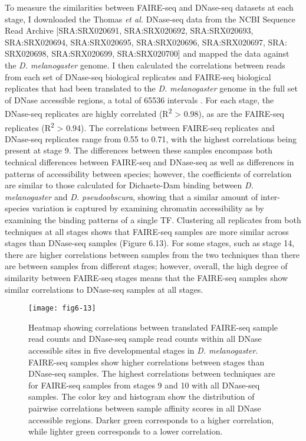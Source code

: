 To measure the similarities between FAIRE-seq and DNase-seq datasets at each stage, I downloaded the Thomas \emph{et al.} DNase-seq data from the NCBI Sequence Read Archive [SRA:SRX020691, SRA:SRX020692, SRA:SRX020693, SRA:SRX020694, SRA:SRX020695, SRA:SRX020696, SRA:SRX020697, SRA:\\
SRX020698, SRA:SRX020699, SRA:SRX020700] and mapped the data against the \emph{D. melanogaster} genome. I then calculated the correlations between reads from each set of DNase-seq biological replicates and FAIRE-seq biological replicates that had been translated to the \emph{D. melanogaster} genome in the full set of DNase accessible regions, a total of 65536 intervals \citep{thomas_dynamic_2011}. For each stage, the DNase-seq replicates are highly correlated (R\textsuperscript{2} > 0.98), as are the FAIRE-seq replicates (R\textsuperscript{2} > 0.94). The correlations between FAIRE-seq replicates and DNase-seq replicates range from 0.55 to 0.71, with the highest correlations being present at stage 9. The differences between these samples encompass both technical differences between FAIRE-seq and DNase-seq as well as differences in patterns of accessibility between species; however, the coefficients of correlation are similar to those calculated for Dichaete-Dam binding between \emph{D. melanogaster} and \emph{D. pseudoobscura}, showing that a similar amount of inter-species variation is captured by examining chromatin accessibility as by examining the binding patterns of a single TF. Clustering all replicates from both techniques at all stages shows that FAIRE-seq samples are more similar across stages than DNase-seq samples (Figure 6.13). For some stages, such as stage 14, there are higher correlations between samples from the two techniques than there are between samples from different stages; however, overall, the high degree of similarity between FAIRE-seq stages means that the FAIRE-seq samples show similar correlations to DNase-seq samples at all stages.\\

\begin{figure}
\centering
\texttt{[image: fig6-13]}
\caption{Heatmap showing correlations between translated FAIRE-seq sample read counts and DNase-seq sample read counts within all DNase accessible sites in five developmental stages in \emph{D. melanogaster}. FAIRE-seq samples show higher correlations between stages than DNase-seq samples. The highest correlations between techniques are for FAIRE-seq samples from stages 9 and 10 with all DNase-seq samples. The color key and histogram show the distribution of pairwise correlations between sample affinity scores in all DNase accessible regions. Darker green corresponds to a higher correlation, while lighter green corresponds to a lower correlation.}
\label{Figure 6.13}
\end{figure}

